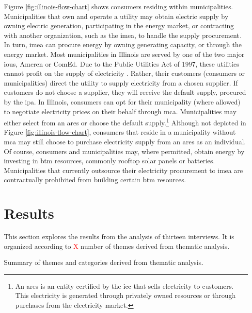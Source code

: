 Figure \ref{fig:illinois-flow-chart} shows consumers residing within
municipalities. Municipalities that own and operate a utility may obtain
electric supply by owning electric generation, participating in the energy
market, or contracting with another organization, such as the \ac{imea}, to
handle the supply procurement. In turn, \ac{imea} can procure energy by owning
generating capacity, or through the energy market. Most municipalities in
Illinois are served by one of the two major \acp{iou}, Ameren or ComEd. Due to
the Public Utilities Act of 1997, these utilities cannot profit on the supply of
electricity \cite{illinois_90th_general_assembly_electric_1997}. Rather, their
customers (consumers or municipalities) direct the utility to supply electricity
from a chosen supplier. If customers do not choose a supplier, they will receive
the default supply, procured by the \ac{ipa}. In Illinois, consumers can opt for
their municipality (where allowed) to negotiate electricity prices on their
behalf through \ac{mca}. Municipalities may either select from an \ac{ares} or
choose the default supply.\footnote{An \ac{ares} is an entity certified by the
\ac{icc} that sells electricity to customers. This electricity is generated
through privately owned resources or through purchases from the electricity
market.} Although not depicted in Figure \ref{fig:illinois-flow-chart},
consumers that reside in a municipality without \ac{mca} may still choose to
purchase electricity supply from an \ac{ares} as an individual. Of course,
consumers and municipalities may, where permitted, obtain energy by investing in
\ac{btm} resources, commonly rooftop solar panels or batteries. Municipalities
that currently outsource their electricity procurement to \ac{imea} are
contractually prohibited from building certain \ac{btm} resources.

\section{Results}
This section explores the results from the analysis of thirteen interviews. It
is organized according to \textcolor{red}{X} number of themes derived from
thematic analysis.

\begin{table}[ht!]
    \centering
    \caption{Summary of themes and categories derived from thematic analysis.}
    \label{tab:themes}
    
\end{table}

